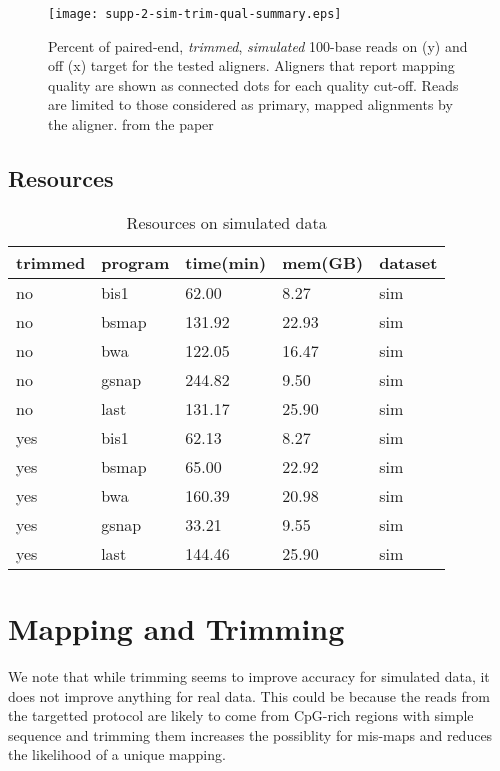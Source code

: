 \documentclass[12pt]{article}
\begin{document}
\begin{figure}[H]%
    \centerline{\texttt{[image: supp-2-sim-trim-qual-summary.eps]}}
    \caption{Percent of paired-end, \emph{trimmed}, \emph{simulated} 100-base reads on (y) and off (x) target for the tested aligners. Aligners that report mapping quality are shown as connected dots for each quality cut-off. Reads are limited to those considered as primary, mapped alignments by the aligner.
from the paper}\label{suppfig:04}
\end{figure}

\subsection{Resources}

\begin{table}[H]
    \centering
    \caption{Resources on simulated data}
    \begin{tabular}{lllll} \hline
    trimmed & program & time(min) & mem(GB) & dataset \\ \hline
    no      & bis1    & 62.00     & 8.27    & sim     \\
    no      & bsmap   & 131.92    & 22.93   & sim     \\
    no      & bwa     & 122.05    & 16.47   & sim     \\
    no      & gsnap   & 244.82    & 9.50    & sim     \\
    no      & last    & 131.17    & 25.90   & sim     \\
    yes     & bis1    & 62.13     & 8.27    & sim     \\
    yes     & bsmap   & 65.00     & 22.92   & sim     \\
    yes     & bwa     & 160.39    & 20.98   & sim     \\
    yes     & gsnap   & 33.21     & 9.55    & sim     \\
    yes     & last    & 144.46    & 25.90   & sim     \\
    \end{tabular}
\end{table}


\section{Mapping and Trimming}
We note that while trimming seems to improve accuracy for simulated data,
it does not improve anything for real data. This could be because
the reads from the targetted protocol are likely to come from CpG-rich regions
with simple sequence and trimming them increases the possiblity for mis-maps
and reduces the likelihood of a unique mapping.
\end{document}
